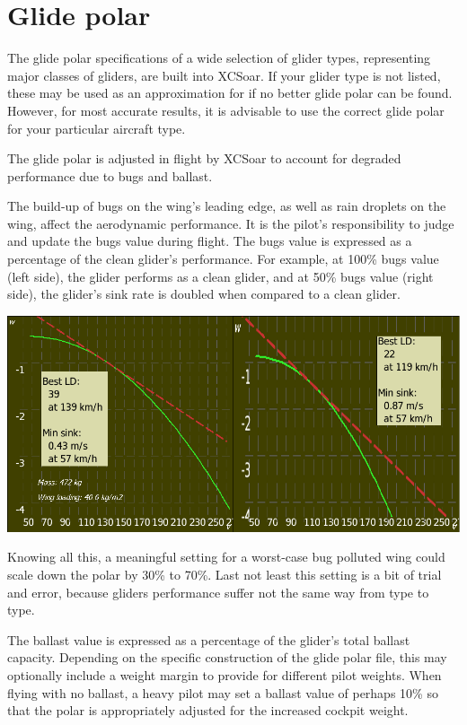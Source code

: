 \section{Glide polar}

The glide polar specifications of a wide selection of glider types,
representing major classes of gliders, are built into XCSoar.
If your glider type is not listed, these may be used as an approximation for  
if no better glide polar can be found.  However, for most accurate results, it is
advisable to use the correct glide polar for your particular
 aircraft type. 

The glide polar is adjusted in flight by XCSoar to account for
degraded performance due to bugs and ballast.

The build-up of bugs on the wing's leading edge, as well as rain
droplets on the wing, affect the aerodynamic performance.  It is the
pilot's responsibility to judge and update the bugs value during
flight.  The bugs value is expressed as a percentage of the clean
glider's performance.  For example, at 100\% bugs value (left side), the glider
performs as a clean glider, and at 50\% bugs value (right side), the glider's
sink rate is doubled when compared to a clean glider. 

\begin{center}
\includegraphics[angle=0,width=\linewidth,keepaspectratio='true']{figures/cut-clean-dirty-polar.png}
\end{center}
Knowing all this, a meaningful setting for a worst-case bug polluted wing could
scale down the polar by 30\% to 70\%. Last not least this setting is a bit of 
trial and error, because gliders performance suffer not the same way from type
to type.

The ballast value is expressed as a percentage of the glider's total
ballast capacity.  Depending on the specific construction of the glide
polar file, this may optionally include a weight margin to provide for
different pilot weights.  When flying with no ballast, a heavy pilot
may set a ballast value of perhaps 10\% so that the polar is
appropriately adjusted for the increased cockpit weight.


